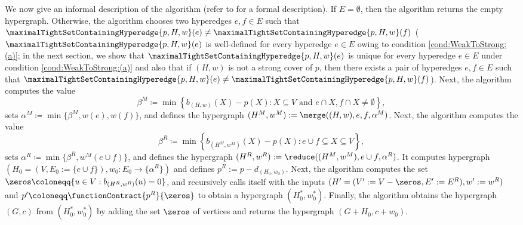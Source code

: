 We now give an informal description of the algorithm (refer to  for a formal description). If $E=\emptyset$, then the algorithm returns the empty hypergraph. Otherwise, the algorithm chooses two hyperedges $e, f \in E$  such that $\maximalTightSetContainingHyperedge{p, H, w}(e)\neq \maximalTightSetContainingHyperedge{p, H, w}(f)$ ($\maximalTightSetContainingHyperedge{p, H, w}(e)$ is well-defined for every hyperedge $e\in E$ owing to condition \ref{cond:WeakToStrong:(a)}; in the next section, we show that $\maximalTightSetContainingHyperedge{p, H, w}(e)$ is unique for every hyperedge $e\in E$ under condition \ref{cond:WeakToStrong:(a)} and also that if $(H, w)$ is not a strong cover of $p$, then there exists a pair of hyperedges $e, f\in E$ such that $\maximalTightSetContainingHyperedge{p, H, w}(e)\neq \maximalTightSetContainingHyperedge{p, H, w}(f)$). 
Next, 
the algorithm computes the value 
 $$\beta^M \coloneqq  \min\left\{b_{(H,w)}(X) - p(X) : X \subseteq V \text{ and } e \cap X, f \cap X \not = \emptyset\right\},$$ sets $\alpha^M \coloneqq  \min\{\beta^M, w(e), w(f)\}$, and defines the hypergraph $(H^M, w^M) := \merge((H, w), e, f, \alpha^M)$.
Next, the algorithm computes the value $$\beta^R \coloneqq  \min\left\{b_{(H^M, w^M)}\left(X\right) - p\left(X\right) : e \cup f \subseteq X \subseteq V\right\},$$ 
    sets $\alpha^R \coloneqq  \min\{\beta^R, w^M(e\cup f)\}$, and defines the hypergraph $(H^R, w^R) := \reduce((H^M, w^M), e \cup f, \alpha^R)$.
It computes hypergraph $(H_0=(V, E_0:=\{e\cup f\}), w_0: E_0\rightarrow \{\alpha^R\})$ and defines $p^R:=p-d_{(H_0, w_0)}$. 
Next, the algorithm computes the set $\zeros \coloneqq  \{u \in V : b_{(H^R, w^R)}(u) = 0\}$, and recursively calls itself with the inputs 
    $(H' = (V':=V-\zeros, E':=E^R),w':=w^R) $ and $p' \coloneqq  \functionContract{p^R}{\zeros}$ to obtain a hypergraph $\left(H_0^*, w_0^*\right)$. Finally, the algorithm obtains the hypergraph $(G, c)$ from $(H_0^*, w_0^*)$ by adding the set $\zeros$ of vertices and returns the hypergraph $(G+H_0, c + w_0)$.



